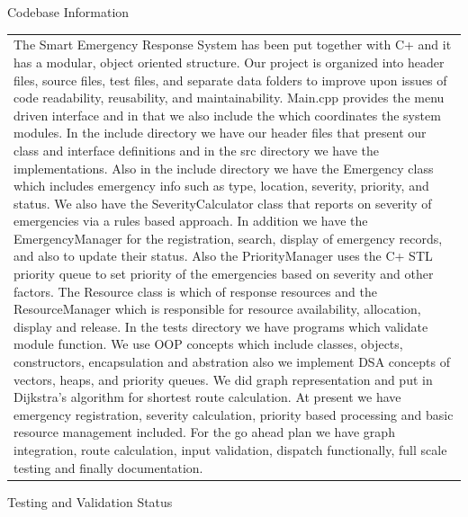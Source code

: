 \documentclass[12pt,a4paper]{article}
\newcommand{\sectiontitle}[1]{%
    {\color{GEUBlue}
    \fontsize{18}{22}\selectfont #1}
}
\newcommand{\instruction}[1]{%
    {\color{InstructionGrey}
    \fontsize{10.5}{13}\selectfont #1}
}
\newcommand{\answerbox}[2]{%
    \begin{tabularx}{\textwidth}{
        |>{\raggedright\arraybackslash}X|}
        \hline
        \parbox[t][#1][t]{\dimexpr\linewidth-12pt\relax}{
            \vspace{5pt}
            \fontsize{11}{13}\selectfont #2
        }\\
        \hline
    \end{tabularx}
}
\begin{document}

\vspace*{1.00cm}

\sectiontitle{Codebase Information }

\vspace{0.35cm}

\instruction{}

\vspace{0.15cm}

\answerbox{8.50cm}{The Smart Emergency Response System has been put together with C+ and it has a modular, object oriented structure. Our project is organized into header files, source files, test files, and separate data folders to improve upon issues of code readability, reusability, and maintainability. Main.cpp provides the menu driven interface and in that we also include the which coordinates the system modules. In the include directory we have our header files that present our class and interface definitions and in the src directory we have the implementations. Also in the include directory we have the Emergency class which includes emergency info such as type, location, severity, priority, and status. We also have the SeverityCalculator class that reports on severity of emergencies via a rules based approach. In addition we have the EmergencyManager for the registration, search, display of emergency records, and also to update their status. Also the PriorityManager uses the C+ STL priority queue to set priority of the emergencies based on severity and other factors. The Resource class is which of response resources and the ResourceManager which is responsible for resource availability, allocation, display and release. In the tests directory we have programs which validate module function. We use OOP concepts which include classes, objects, constructors, encapsulation and abstration also we implement DSA concepts of vectors, heaps, and priority queues. We did graph representation and put in Dijkstra’s algorithm for shortest route calculation. At present we have emergency registration, severity calculation, priority based processing and basic resource management included. For the go ahead plan we have graph integration, route calculation, input validation, dispatch functionally, full scale testing and finally documentation.
}

\vspace{0.45cm}
\newpage
\sectiontitle{Testing and Validation Status}
\end{document}
